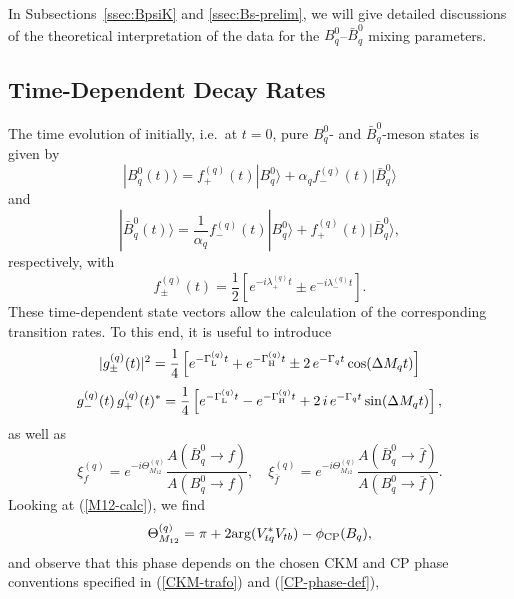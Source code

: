 \documentclass[12pt]{article}
\begin{document}
In Subsections~\ref{ssec:BpsiK} and \ref{ssec:Bs-prelim}, we will give detailed
discussions of the theoretical interpretation of the data for the $B^0_q$--$\bar B^0_q$
mixing parameters.


%
%
%
\subsection{Time-Dependent Decay Rates}
%
%
%
The time evolution of initially, i.e.\ at $t=0$, pure $B^0_q$- and 
$\bar B^0_q$-meson states is given by
\begin{equation}
|B^0_q(t)\rangle=f_+^{(q)}(t)|B^{0}_q\rangle
+\alpha_qf_-^{(q)}(t)|\bar B^{0}_q\rangle
\end{equation}
and
\begin{equation}
|\bar B^0_q(t)\rangle=\frac{1}{\alpha_q}f_-^{(q)}(t)
|B^{0}_q\rangle+f_+^{(q)}(t)|\bar B^{0}_q\rangle,
\end{equation}
respectively, with
\begin{equation}\label{f-functions}
f_{\pm}^{(q)}(t)=\frac{1}{2}\left[e^{-i\lambda_+^{(q)}t}\pm
e^{-i\lambda_-^{(q)}t}\right].
\end{equation}
These time-dependent state vectors allow the calculation of the 
corresponding transition rates. To this end, it is useful to introduce
\begin{equation}\label{g-funct-1}
|g^{(q)}_{\pm}(t)|^2=\frac{1}{4}\left[e^{-\Gamma_{\rm L}^{(q)}t}+
e^{-\Gamma_{\rm H}^{(q)}t}\pm2\,e^{-\Gamma_q t}\cos(\Delta M_qt)\right]
\end{equation}
\begin{equation}\label{g-funct-2}
g_-^{(q)}(t)\,g_+^{(q)}(t)^\ast=\frac{1}{4}\left[e^{-\Gamma_{\rm L}^{(q)}t}-
e^{-\Gamma_{\rm H}^{(q)}t}+2\,i\,e^{-\Gamma_q t}\sin(\Delta M_qt)\right],
\end{equation}
as well as
\begin{equation}\label{xi-def}
\xi_f^{(q)}=e^{-i\Theta_{M_{12}}^{(q)}}
\frac{A(\bar B_q^0\to f)}{A(B_q^0\to f)},\quad
\xi_{\bar f}^{(q)}=e^{-i\Theta_{M_{12}}^{(q)}}
\frac{A(\bar B_q^0\to \bar f)}{A(B_q^0\to \bar f)}.
\end{equation}
Looking at (\ref{M12-calc}), we find
\begin{equation}\label{theta-def}
\Theta_{M_{12}}^{(q)}=\pi+2\mbox{arg}(V_{tq}^\ast V_{tb})-
\phi_{\mbox{{\scriptsize CP}}}(B_q),
\end{equation}
and observe that this phase depends on the chosen CKM and 
CP phase conventions specified in (\ref{CKM-trafo}) and (\ref{CP-phase-def}), 
\end{document}
